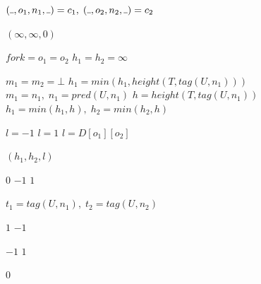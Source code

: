 \documentclass[AMA,STIX1COL]{WileyNJD-v2}
\newcommand{\Xund}{\rule{.4em}{.4pt}}
\begin{document}
\begin{algorithm}[H] \DontPrintSemicolon {} 
\begin{multicols}{2}

     {
        $(\Xund, o_1, n_1, \Xund) = c_1, \; (\Xund, o_2, n_2, \Xund) = c_2$ \;

         {
            \Return $(\infty, \infty, 0)$
        }

        \BlankLine
        $f\!ork = o_1 = o_2$ \;
         {
            $h_1 = h_2 = \infty$
        }

        \BlankLine
        $m_1 = m_2 = \bot$ \;
         {
             {
                $h_1 = min(h_1, height(T, tag(U, n_1)))$ \;
                $m_1 = n_1, \; n_1 = pred(U, n_1)$ \;
            }
        }
         {
            $h = height(T, tag(U, n_1))$ \;
            $h_1 = min(h_1, h), \; h_2 = min(h_2, h)$ \;
        }

        \BlankLine
            {$l = -1$}
            {$l = 1$ }
          {$l = D[o_1][o_2]$}

        \BlankLine
        \Return $(h_1, h_2, l)$ \;
    }
    \BlankLine
    \BlankLine

     {

         { \Return $0$ }
         { \Return $-1$ }
         { \Return $1$ }

        \BlankLine
        $t_1 = tag(U, n_1), \; t_2 = tag(U, n_2)$ \;

        \BlankLine
         { \Return $1$ }
         { \Return $-1$ }

        \BlankLine
         { \Return $-1$ }
         { \Return $1$ }

        \BlankLine
        \Return $0$
    }
    \BlankLine
    \BlankLine


\end{multicols}
\end{algorithm}
\end{document}
